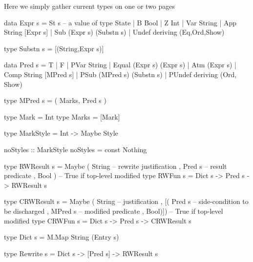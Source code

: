 \label{ha:calc-types-txt}

Here we simply gather current types on one or two pages
\begin{code}
data Expr s
 = St s  -- a value of type State
 | B Bool
 | Z Int
 | Var String
 | App String [Expr s]
 | Sub (Expr s) (Substn s)
 | Undef
 deriving (Eq,Ord,Show)

type Substn s = [(String,Expr s)]
\end{code}

\begin{code}
data Pred s
 = T
 | F
 | PVar String
 | Equal (Expr s) (Expr s)
 | Atm (Expr s)
 | Comp String [MPred s]
 | PSub (MPred s) (Substn s)
 | PUndef
 deriving (Ord, Show)
\end{code}

\begin{code}
type MPred s = ( Marks, Pred s )

type Mark = Int
type Marks = [Mark]
\end{code}

\begin{code}
type MarkStyle = Int -> Maybe Style

noStyles :: MarkStyle
noStyles = const Nothing
\end{code}

\begin{code}
type RWResult s
 = Maybe ( String  -- rewrite justification
         , Pred s  -- result predicate
         , Bool )  -- True if top-level modified
type RWFun s = Dict s -> Pred s -> RWResult s
\end{code}

\begin{code}
type CRWResult s
 = Maybe ( String      -- justification
         , [( Pred s   -- side-condition to be discharged
            , MPred s  -- modified predicate
            , Bool)])  -- True if top-level modified
type CRWFun s = Dict s -> Pred s -> CRWResult s
\end{code}

\begin{code}
type Dict s = M.Map String (Entry s)
\end{code}

\begin{code}
type Rewrite s = Dict s -> [Pred s] -> RWResult s
\end{code}


